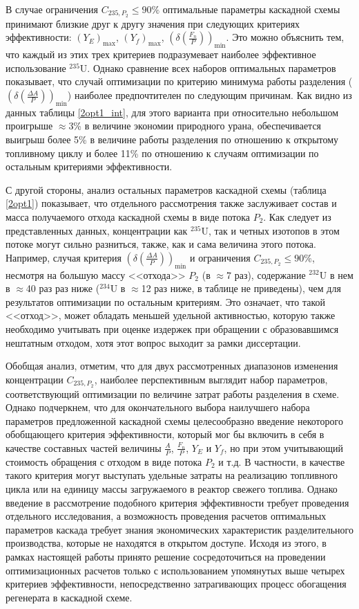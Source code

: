 В случае ограничения $C_{235,{P_2}} \leq 90\%$ оптимальные параметры каскадной схемы принимают близкие друг к другу значения при следующих критериях эффективности: $(Y_{E})_\text{max}$, $(Y_f)_\text{max}$, $(\delta(\frac{F_n}{P}))_\text{min}$. Это можно объяснить тем, что каждый из этих трех критериев подразумевает наиболее эффективное использование $^{235}$U. Однако сравнение всех наборов оптимальных параметров показывает, что случай оптимизации по критерию минимума работы разделения ($(\delta(\frac{\Delta A}{P}))_\text{min}$) наиболее предпочтителен по следующим причинам. Как видно из данных таблицы \ref{2opt1_int}, для этого варианта при относительно небольшом проигрыше $\approx$3\% в величине экономии природного урана, обеспечивается выигрыш более 5\% в величине работы разделения по отношению к открытому топливному циклу и более 11\% по отношению к случаям оптимизации по остальным критериями эффективности.

С другой стороны, анализ остальных параметров каскадной схемы (таблица \ref{2opt1}) показывает, что отдельного рассмотрения также заслуживает состав и масса получаемого отхода каскадной схемы в виде потока $P_2$. Как следует из представленных данных, концентрации как $^{235}$U, так и четных изотопов в этом потоке могут сильно разниться, также, как и сама величина этого потока. Например, случая критерия $(\delta(\frac{\Delta A}{P}))_\text{min}$ и ограничения $C_{235,{P_2}} \leq 90\%$, несмотря на большую массу <<отхода>> $P_{2}$ (в $\approx$7 раз), содержание $^{232}$U в нем в $\approx$40 раз раз ниже ($^{234}$U в $\approx$12 раз ниже, в таблице не приведены), чем для результатов оптимизации по остальным критериям. Это означает, что такой <<отход>>, может обладать меньшей удельной активностью, которую также необходимо учитывать при оценке издержек при обращении с образовавшимся нештатным отходом, хотя этот вопрос выходит за рамки диссертации. 

Обобщая анализ, отметим, что для двух рассмотренных диапазонов изменения концентрации $C_{235,{P_2}}$, наиболее перспективным выглядит набор параметров, соответствующий оптимизации по величине затрат работы разделения в схеме. Однако подчеркнем, что для окончательного выбора наилучшего набора параметров предложенной каскадной схемы целесообразно введение некоторого обобщающего критерия эффективности, который мог бы включить в себя в качестве составных частей величины $\frac{A}{P}$, $\frac{F_n}{P}$, $Y_E$ и $Y_f$, но при этом учитывающий стоимость обращения с отходом в виде потока $P_2$ и т.д. В частности, в качестве такого критерия могут выступать удельные затраты на реализацию топливного цикла или на единицу массы загружаемого в реактор свежего топлива. Однако введение в рассмотрение подобного критерия эффективности требует проведения отдельного исследования, а возможность проведения расчетов оптимальных параметров каскада требует знания экономических характеристик разделительного производства, которые не находятся в открытом доступе. Исходя из этого, в рамках настоящей работы принято решение сосредоточиться на проведении оптимизационных расчетов только с использованием упомянутых выше четырех критериев эффективности, непосредственно затрагивающих процесс обогащения регенерата в каскадной схеме.

